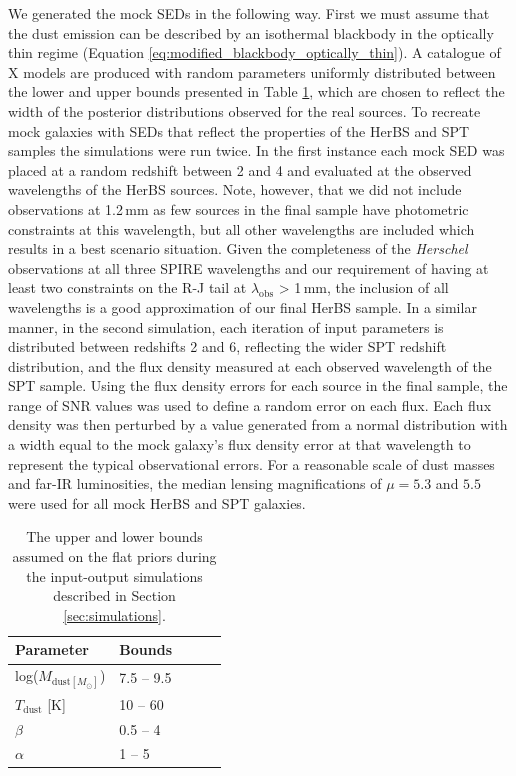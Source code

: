We generated the mock SEDs in the following way. First we must assume that the dust emission can be described by an isothermal blackbody in the optically thin regime (Equation \ref{eq:modified_blackbody_optically_thin}). A catalogue of {\color{red} X} models are produced with random parameters uniformly distributed between the lower and upper bounds presented in Table \ref{tab:simulation_inputs}, which are chosen to reflect the width of the posterior distributions observed for the real sources. To recreate mock galaxies with SEDs that reflect the properties of the HerBS and SPT samples the simulations were run twice. In the first instance each mock SED was placed at a random redshift between 2 and 4 and evaluated at the observed wavelengths of the HerBS sources. Note, however, that we did not include observations at 1.2\,mm as few sources in the final sample have photometric constraints at this wavelength, but all other wavelengths are included which results in a best scenario situation. Given the completeness of the \textit{Herschel} observations at all three SPIRE wavelengths and our requirement of having at least two constraints on the R-J tail at $\lambda_{\textrm{obs}}$ > 1\,mm, the inclusion of all wavelengths is a good approximation of our final HerBS sample. In a similar manner, in the second simulation, each iteration of input parameters is distributed between redshifts 2 and 6, reflecting the wider SPT redshift distribution, and the flux density measured at each observed wavelength of the SPT sample. Using the flux density errors for each source in the final sample, the range of SNR values was used to define a random error on each flux. Each flux density was then perturbed by a value generated from a normal distribution with a width equal to the mock galaxy's flux density error at that wavelength to represent the typical observational errors. For a reasonable scale of dust masses and far-IR luminosities, the median lensing magnifications of $\mu = 5.3$ and $5.5$ were used for all mock HerBS and SPT galaxies.

\begin{table}
    \centering
    \begin{tabular}{|p{3cm}|p{3cm}|p{3cm}|p{3cm}|p{3cm}|}
        \hline
        Parameter & Bounds \\
        \hline
        \hline
        log($M_{\textrm{dust} [M_\odot]}$) & 7.5 -- 9.5 \\
		$T_{\textrm{dust}}$ [K] & 10 -- 60 \\
		$\beta$  & 0.5 -- 4 \\
		$\alpha$  & 1 -- 5 \\
        \hline
    \end{tabular}
    \caption{The upper and lower bounds assumed on the flat priors during the input-output simulations described in Section \ref{sec:simulations}.}
    \label{tab:simulation_inputs}
\end{table}

